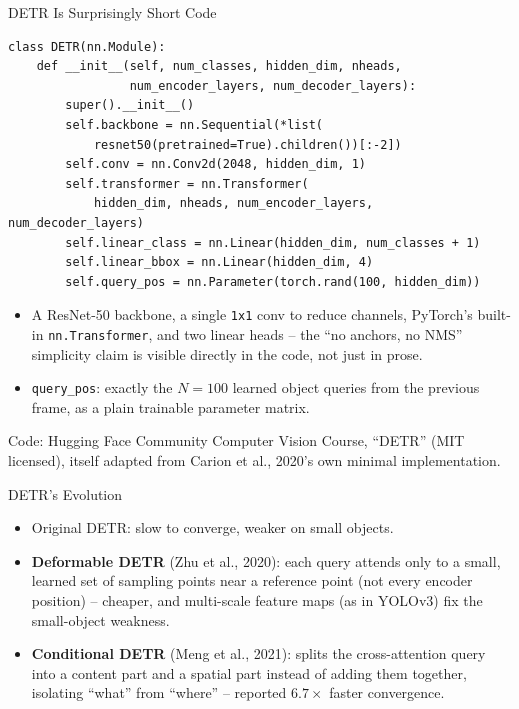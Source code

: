\begin{vbframe}{DETR Is Surprisingly Short Code}
{\footnotesize
\begin{verbatim}
class DETR(nn.Module):
    def __init__(self, num_classes, hidden_dim, nheads,
                 num_encoder_layers, num_decoder_layers):
        super().__init__()
        self.backbone = nn.Sequential(*list(
            resnet50(pretrained=True).children())[:-2])
        self.conv = nn.Conv2d(2048, hidden_dim, 1)
        self.transformer = nn.Transformer(
            hidden_dim, nheads, num_encoder_layers, num_decoder_layers)
        self.linear_class = nn.Linear(hidden_dim, num_classes + 1)
        self.linear_bbox = nn.Linear(hidden_dim, 4)
        self.query_pos = nn.Parameter(torch.rand(100, hidden_dim))
\end{verbatim}}
\begin{itemize}
  \item A ResNet-50 backbone, a single \texttt{1x1} conv to reduce channels, PyTorch's built-in \texttt{nn.Transformer}, and two linear heads -- the ``no anchors, no NMS'' simplicity claim is visible directly in the code, not just in prose.
  \item \texttt{query\_pos}: exactly the $N=100$ learned object queries from the previous frame, as a plain trainable parameter matrix.
\end{itemize}
{\footnotesize Code: Hugging Face Community Computer Vision Course, \enquote{DETR} (MIT licensed), itself adapted from Carion et al., 2020's own minimal implementation.}
\end{vbframe}

\begin{vbframe}{DETR's Evolution}
\begin{itemize}
  \item Original DETR: slow to converge, weaker on small objects.
  \item \textbf{Deformable DETR} (Zhu et al., 2020): each query attends only to a small, learned set of sampling points near a reference point (not every encoder position) -- cheaper, and multi-scale feature maps (as in YOLOv3) fix the small-object weakness.
  \item \textbf{Conditional DETR} (Meng et al., 2021): splits the cross-attention query into a content part and a spatial part instead of adding them together, isolating ``what'' from ``where'' -- reported $6.7\times$ faster convergence.
\end{itemize}
\end{vbframe}

